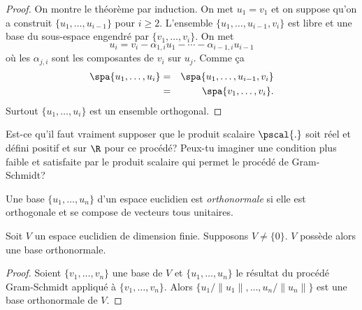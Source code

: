 \begin{proof}
  On montre le théorème par induction.  On met $u_1 = v_1$
  et on suppose qu'on a construit $\{u_1,\dots,u_{i-1}\}$
  pour $i \geq 2$.
  L'ensemble $\{u_1,\dots,u_{i-1},v_i\}$
  est libre et une base du sous-espace engendré
  par $\{v_1,\dots,v_i\}$.
  On met  
  \begin{displaymath}
    u_i = v_i - \alpha_{1,i}  u_1 - \cdots - \alpha_{i-1,i} u_{i-1}
  \end{displaymath}
  où les $\alpha_{j,i}$
  sont les composantes de $v_i$
  sur $u_j$.
  Comme ça 
  \begin{eqnarray*}
    \spa \{u_1,\dots,u_i\} & = & \spa\{u_1,\dots,u_{i-1},v_i\} \\
                           &=  &\spa\{v_1,\dots,v_i\}.
  \end{eqnarray*}
  Surtout $\{u_1,\dots,u_i\}$ est un ensemble orthogonal.  
\end{proof}



\begin{exercise}
  \label{exe:6}
  Est-ce qu'il faut vraiment supposer que le produit scalaire
  $\pscal{.}$
  soit réel et défini positif et sur $\R$ pour ce procédé? Peux-tu imaginer une condition plus
  faible et satisfaite par le produit scalaire qui permet
  le procédé de Gram-Schmidt? 
\end{exercise}



\begin{definition}
  \label{def:7}
  Une base $\{u_1,\dots,u_n\}$
  d'un espace euclidien est \emph{orthonormale} si elle est
  orthogonale et se compose de vecteurs tous unitaires.
\end{definition}




\begin{corollary}
  \label{co:1}
  Soit $V$
  un espace euclidien de dimension finie. Supposons $V \neq
  \{0\}$. $V$ possède alors une base orthonormale.
\end{corollary}

\begin{proof}
  Soient $\{v_1,\dots,v_n\}$ une base de $V$ et $\{u_1,\dots,u_n\}$ le résultat du procédé Gram-Schmidt appliqué à $\{v_1,\dots,v_n\}$. Alors $\{u_1/ \|u_1\|,\dots,u_n/\|u_n\|\}$ est une base orthonormale de $V$. 
\end{proof}


